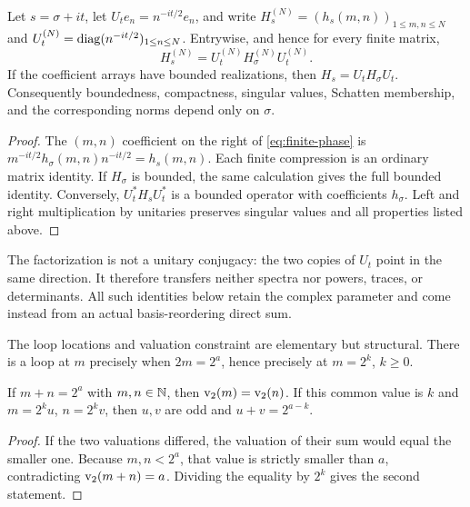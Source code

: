 \begin{lemma}
\label{lem:phase}
Let $s=\sigma+it$, let $U_t e_n=n^{-it/2}e_n$, and write
$H_s^{(N)}=(h_s(m,n))_{1\le m,n\le N}$ and
$U_t^{(N)}=\operatorname{diag}(n^{-it/2})_{1\le n\le N}$.  Entrywise, and hence for every
finite matrix,
\begin{equation}
  H_s^{(N)}=U_t^{(N)}H_\sigma^{(N)}U_t^{(N)}.
  \label{eq:finite-phase}
\end{equation}
If the coefficient arrays have bounded realizations, then
$H_s=U_tH_\sigma U_t$.  Consequently boundedness, compactness, singular
values, Schatten membership, and the corresponding norms depend only on
$\sigma$.
\end{lemma}

\begin{proof}
The $(m,n)$ coefficient on the right of \cref{eq:finite-phase} is
$m^{-it/2}h_\sigma(m,n)n^{-it/2}=h_s(m,n)$.  Each finite compression is an
ordinary matrix identity.  If $H_\sigma$ is bounded, the same calculation
gives the full bounded identity.  Conversely, $U_t^*H_sU_t^*$ is a bounded
operator with coefficients $h_\sigma$.  Left and right multiplication by
unitaries preserves singular values and all properties listed above.
\end{proof}

The factorization is not a unitary conjugacy: the two copies of $U_t$ point
in the same direction.  It therefore transfers neither spectra nor powers,
traces, or determinants.  All such identities below retain the complex
parameter and come instead from an actual basis-reordering direct sum.

The loop locations and valuation constraint are elementary but structural.
There is a loop at $m$ precisely when $2m=2^a$, hence precisely at
$m=2^k$, $k\ge0$.

\begin{lemma}
\label{lem:valuation}
If $m+n=2^a$ with $m,n\in\mathbb N$, then $\operatorname{v_2}(m)=\operatorname{v_2}(n)$.  If this common
value is $k$ and $m=2^ku$, $n=2^kv$, then $u,v$ are odd and
$u+v=2^{a-k}$.
\end{lemma}

\begin{proof}
If the two valuations differed, the valuation of their sum would equal the
smaller one.  Because $m,n<2^a$, that value is strictly smaller than $a$,
contradicting $\operatorname{v_2}(m+n)=a$.  Dividing the equality by $2^k$ gives the
second statement.
\end{proof}
